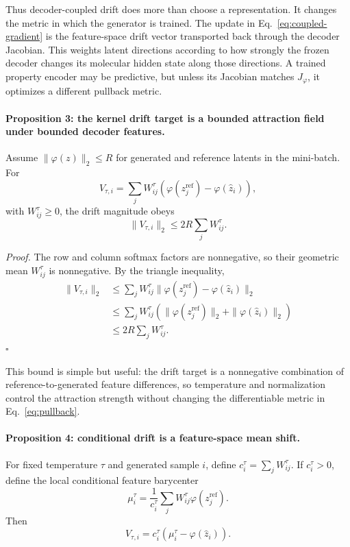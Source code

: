 \documentclass[letterpaper]{article}
\begin{document}
Thus decoder-coupled drift does more than choose a representation.  It changes
the metric in which the generator is trained.  The update in
Eq.~\eqref{eq:coupled-gradient} is the feature-space drift vector transported
back through the decoder Jacobian.  This weights latent directions according to
how strongly the frozen decoder changes its molecular hidden state along those
directions.  A trained property encoder may be predictive, but unless its
Jacobian matches $J_\varphi$, it optimizes a different pullback metric.

\paragraph{Proposition 3: the kernel drift target is a bounded attraction field
under bounded decoder features.}
Assume $\|\varphi(z)\|_2\le R$ for generated and reference latents in the
mini-batch.  For
\begin{equation}
    V_{\tau,i}=\sum_j W_{ij}^{\tau}
    \left(\varphi(z_j^{\mathrm{ref}})-\varphi(\hat z_i)\right),
\end{equation}
with $W_{ij}^{\tau}\ge0$, the drift magnitude obeys
\begin{equation}
    \|V_{\tau,i}\|_2
    \le
    2R\sum_j W_{ij}^{\tau}.
\end{equation}

\emph{Proof.}
The row and column softmax factors are nonnegative, so their geometric mean
$W_{ij}^{\tau}$ is nonnegative.  By the triangle inequality,
\begin{align}
\|V_{\tau,i}\|_2
&\le
\sum_j W_{ij}^{\tau}
\|\varphi(z_j^{\mathrm{ref}})-\varphi(\hat z_i)\|_2 \nonumber\\
&\le
\sum_j W_{ij}^{\tau}
\left(\|\varphi(z_j^{\mathrm{ref}})\|_2
+\|\varphi(\hat z_i)\|_2\right) \nonumber\\
&\le 2R\sum_j W_{ij}^{\tau}.
\end{align}
\hfill $\square$

This bound is simple but useful: the drift target is a nonnegative combination
of reference-to-generated feature differences, so temperature and normalization
control the attraction strength without changing the differentiable metric in
Eq.~\eqref{eq:pullback}.

\paragraph{Proposition 4: conditional drift is a feature-space mean shift.}
For fixed temperature $\tau$ and generated sample $i$, define
$c_i^\tau=\sum_j W_{ij}^\tau$.  If $c_i^\tau>0$, define the local conditional
feature barycenter
\begin{equation}
    \mu_i^\tau =
    \frac{1}{c_i^\tau}
    \sum_j W_{ij}^\tau\varphi(z_j^{\mathrm{ref}}).
\end{equation}
Then
\begin{equation}
    V_{\tau,i}
    =
    c_i^\tau\left(\mu_i^\tau-\varphi(\hat z_i)\right).
    \label{eq:mean-shift}
\end{equation}
\end{document}
